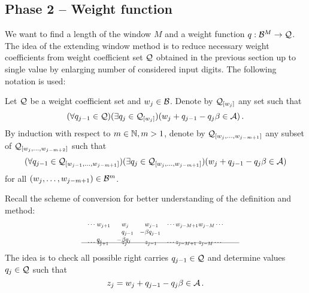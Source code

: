     
    





\subsection{Phase 2 -- Weight function}
    We want to find a length of the window $M$ and a weight function $q:\mathcal{B}^{M} \to \mathcal{Q}$. The idea of the extending window method is to reduce necessary weight coefficients from weight coefficient set $\mathcal{Q}$ obtained in the previous section up to single value by enlarging number of considered input digits. The following notation is used: 
    \begin{defn}
        Let $\mathcal{Q}$ be a weight coefficient set and $w_j\in \mathcal{B}$. Denote by $\mathcal{Q}_{[w_j]}$ any set such that
        $$
            (\forall q_{j-1} \in \mathcal{Q})(\exists q_j \in \mathcal{Q}_{[w_j]})(w_j + q_{j-1} - q_j \beta \in \mathcal{A})\,.
        $$
        By induction with respect to $m \in \mathbb{N}, m>1$, denote by $\mathcal{Q}_{[w_{j},\dots, w_{j-m+1}]}$ any subset of  $\mathcal{Q}_{[w_{j},\dots, w_{j-m+2}]}$ such that 
        $$
           (\forall q_{j-1} \in \mathcal{Q}_{[w_{j-1},\dots, w_{j-m+1}]})(\exists q_j \in \mathcal{Q}_{[w_{j},\dots, w_{j-m+1}]})(w_j + q_{j-1} - q_j \beta \in \mathcal{A})
        $$
        for all $(w_{j},\dots, w_{j-m+1})\in \mathcal{B}^{m}$.
    \end{defn}
  
    Recall the scheme of conversion for better understanding of the definition and method:
    \begin{align*}
        \hspace{130pt}\cdots\; &w_{j+1}&\!\! &w_j  & \!\!  &w_{j-1}&\cdots w_{j-M+1} &w_{j-M}\cdots \hspace{130pt} \\[-3pt] 
                         & &       &q_{j-1}& -&\beta q_{j-1} \\[-3pt]
                           &q_j&   -&\beta q_j &&\\[-15pt]      
    \intertext{\hspace{120pt}\line(1,0){250}} 
          \vspace{-15pt}
          \\[-30pt]
     \cdots\; &z_{j+1}& &z_j& &z_{j-1}& \cdots z_{j-M+1}\; &z_{j-M}\cdots                     
    \end{align*}     
    The idea is to check all possible right carries $q_{j-1}\in\mathcal{Q}$ and determine values $q_j\in\mathcal{Q}$ such that 
    $$
    z_j=w_j + q_{j-1} - q_j \beta \in \mathcal{A} \,.
    $$  
    
